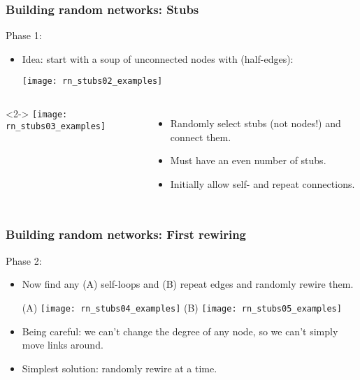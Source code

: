 \begin{frame}[label=]
  \frametitle{Building random networks: Stubs}

  \begin{block}{Phase 1:}
    \begin{itemize}
    \item<1-> \alert{Idea:} start with a soup of unconnected nodes
      with  (half-edges):
      \begin{center}
        \texttt{[image: rn\_stubs02\_examples]}
      \end{center}
    \end{itemize}
    \begin{columns}<2->
      \texttt{[image: rn\_stubs03\_examples]}
      \begin{itemize}
      \item<3-> Randomly select stubs (not nodes!) and connect them.
      \item<4-> Must have an even number of stubs.
      \item<5-> Initially allow \alert{self-} and \alert{repeat} connections.
      \end{itemize}
    \end{columns}

  \end{block}

\end{frame}



\begin{frame}[label=]
  \frametitle{Building random networks: First rewiring}

  \begin{block}{Phase 2:}
    \begin{itemize}
    \item<1-> Now find any (A) self-loops and (B) repeat edges 
      and \alert{randomly rewire} them.
      \begin{center}
        (A)
        \texttt{[image: rn\_stubs04\_examples]}
        \qquad
        (B)
        \texttt{[image: rn\_stubs05\_examples]}
      \end{center}
    \item<2-> \alert{Being careful:} we can't change
      the degree of any node, so we can't simply move
      links around.
    \item<3-> \alert{Simplest solution:} 
      randomly rewire  at a time.
    \end{itemize}
  \end{block}

\end{frame}


